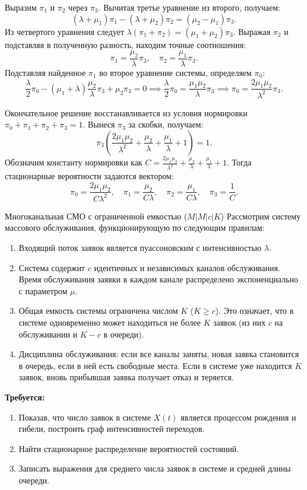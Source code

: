 \begin{eproof}
Выразим $\pi_1$ и $\pi_2$ через $\pi_3$. Вычитая третье уравнение из второго, получаем:
$$
(\lambda + \mu_1)\pi_1 - (\lambda + \mu_2)\pi_2 = (\mu_2 - \mu_1)\pi_3.
$$
Из четвертого уравнения следует $\lambda(\pi_1 + \pi_2) = (\mu_1 + \mu_2)\pi_3$. Выражая $\pi_2$ и подставляя в полученную разность, находим точные соотношения:
$$
\pi_1 = \frac{\mu_2}{\lambda}\pi_3, \quad \pi_2 = \frac{\mu_1}{\lambda}\pi_3.
$$
Подставляя найденное $\pi_1$ во второе уравнение системы, определяем $\pi_0$:
$$
\frac{\lambda}{2} \pi_0 - (\mu_1 + \lambda)\frac{\mu_2}{\lambda}\pi_3 + \mu_2 \pi_3 = 0 \implies \frac{\lambda}{2} \pi_0 = \frac{\mu_1\mu_2}{\lambda}\pi_3 \implies \pi_0 = \frac{2\mu_1\mu_2}{\lambda^2}\pi_3.
$$

Окончательное решение восстанавливается из условия нормировки $\pi_0 + \pi_1 + \pi_2 + \pi_3 = 1$. Вынеся $\pi_3$ за скобки, получаем:
$$
\pi_3 \left( \frac{2\mu_1\mu_2}{\lambda^2} + \frac{\mu_2}{\lambda} + \frac{\mu_1}{\lambda} + 1 \right) = 1.
$$
Обозначим константу нормировки как $C = \frac{2\mu_1\mu_2}{\lambda^2} + \frac{\mu_2}{\lambda} + \frac{\mu_1}{\lambda} + 1$. Тогда стационарные вероятности задаются вектором:
$$
\pi_0 = \frac{2\mu_1\mu_2}{C\lambda^2}, \quad 
\pi_1 = \frac{\mu_2}{C\lambda}, \quad 
\pi_2 = \frac{\mu_1}{C\lambda}, \quad 
\pi_3 = \frac{1}{C}.
$$
\end{eproof}

\begin{example}{Многоканальная СМО с ограниченной емкостью ($M|M|c|K$)}
Рассмотрим систему массового обслуживания, функционирующую по следующим правилам:
\begin{enumerate}
    \item Входящий поток заявок является пуассоновским с интенсивностью $\lambda$.
    \item Система содержит $c$ идентичных и независимых каналов обслуживания. Время обслуживания заявки в каждом канале распределено экспоненциально с параметром $\mu$.
    \item Общая емкость системы ограничена числом $K$ ($K \ge c$). Это означает, что в системе одновременно может находиться не более $K$ заявок (из них $c$ на обслуживании и $K-c$ в очереди).
    \item Дисциплина обслуживания: если все каналы заняты, новая заявка становится в очередь, если в ней есть свободные места. Если в системе уже находится $K$ заявок, вновь прибывшая заявка получает отказ и теряется.
\end{enumerate}

\textbf{Требуется:}
\begin{enumerate}
    \item Показав, что число заявок в системе $X(t)$ является процессом рождения и гибели, построить граф интенсивностей переходов.
    \item Найти стационарное распределение вероятностей состояний.
    \item Записать выражения для среднего числа заявок в системе и средней длины очереди.
\end{enumerate}
\end{example}

